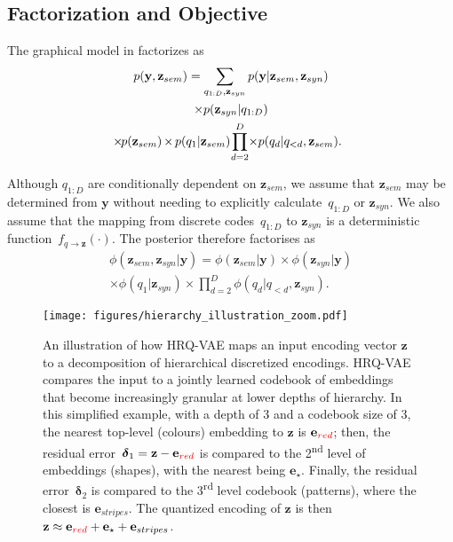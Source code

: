 \documentclass[11pt]{article}
\begin{document}
\subsection{Factorization and Objective}

The graphical model in  factorizes as
\begin{multline}
    p(\textbf{y}, \textbf{z}_{sem}) = \sum_{q_{1:D},\textbf{z}_{syn}}p(\textbf{y}| \textbf{z}_{sem}, \textbf{z}_{syn}) \\
    \times p(\textbf{z}_{syn} | q_{1:D}) \\ 
\hspace*{-.2cm}\times\hspace*{-.3ex}p(\textbf{z}_{sem})
\hspace*{-.2ex}\times\hspace*{-.2ex} p(q_1 | \textbf{z}_{sem}) \hspace*{-.3ex}\prod
\limits_{d=2}^D \hspace*{-.4ex}\times p(q_d | q_{< d}, \textbf{z}_{sem})
    .
\end{multline}


Although  $q_{1:D}$ are conditionally dependent on
$\textbf{z}_{sem}$, we assume that
$\textbf{z}_{sem}$ may be determined from $\textbf{y}$ without needing
to explicitly calculate~$q_{1:D}$ or $\textbf{z}_{syn}$. We also assume that the mapping
from discrete codes~$q_{1:D}$ to $\textbf{z}_{syn}$ is a deterministic
function~$f_{q \rightarrow \textbf{z}}(\cdot)$. The posterior
therefore factorises as
\begin{multline}
    \phi(\textbf{z}_{sem}, \textbf{z}_{syn} | \textbf{y}) =
     \phi(\textbf{z}_{sem} | \textbf{y}) \times \phi(\textbf{z}_{syn} | \textbf{y})  \\
     \times \phi(q_1 | \textbf{z}_{syn}) \times \prod \limits_{d=2}^D \phi(q_d | q_{< d}, \textbf{z}_{syn}).
\end{multline}




\begin{figure*}[t!]
    \centering
\texttt{[image: figures/hierarchy\_illustration\_zoom.pdf]}  
\caption{An illustration of how HRQ-VAE maps an input encoding vector $\textbf{z}$ to a decomposition of hierarchical discretized encodings. HRQ-VAE compares the input to a jointly learned codebook of embeddings that become increasingly granular at lower depths of hierarchy. In this simplified example, with a depth of 3 and a codebook size of 3, the nearest top-level (colours) embedding to $\textbf{z}$ is $\textbf{e}_{\textcolor{red}{red}}$; then, the residual error~$\boldsymbol{\delta}_1 = \textbf{z} - \textbf{e}_{\textcolor{red}{red}}$ is compared to the 2\textsuperscript{nd} level of embeddings (shapes), with the nearest being $\textbf{e}_{\star}$. Finally, the residual error~$\boldsymbol{\delta}_2$ is compared to the 3\textsuperscript{rd} level codebook (patterns), where the closest is $\textbf{e}_{stripes}$. The quantized encoding of $\textbf{z}$ is then  $\textbf{z} \approx \textbf{e}_{\textcolor{red}{red}} + \textbf{e}_{\star} + \textbf{e}_{stripes}$.}
    \vspace{-0.4cm}
    \label{fig:illustration}
\end{figure*}
\end{document}
